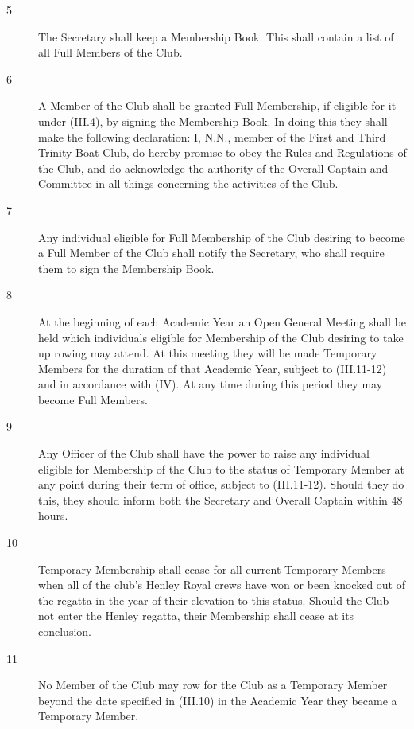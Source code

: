 \documentclass{article}
\begin{document}
\begin{description}
\begin{description}
	\item[5] The Secretary shall keep a Membership Book. This shall contain a list of all
	Full Members of the Club.\\
	
	\item[6] A Member of the Club shall be granted Full Membership, if eligible for it
	under (III.4), by signing the Membership Book. In doing this they shall make
	the following declaration: I, N.N., member of the First and Third Trinity Boat
	Club, do hereby promise to obey the Rules and Regulations of the Club, and
	do acknowledge the authority of the Overall Captain and Committee in all
	things concerning the activities of the Club.\\
	
	\item[7] Any individual eligible for Full Membership of the Club desiring to become a
	Full Member of the Club shall notify the Secretary, who shall require them to
	sign the Membership Book.\\
	
	\item[8] At the beginning of each Academic Year an Open General Meeting shall be
	held which individuals eligible for Membership of the Club desiring to take up
	rowing may attend. At this meeting they will be made Temporary Members
	for the duration of that Academic Year, subject to (III.11-12) and in
	accordance with (IV). At any time during this period they may become Full
	Members.\\
	
	\item[9] Any Officer of the Club shall have the power to raise any individual eligible
	for Membership of the Club to the status of Temporary Member at any point
	during their term of office, subject to (III.11-12). Should they do this, they
	should inform both the Secretary and Overall Captain within 48 hours.\\
	
	\item[10] Temporary Membership shall cease for all current Temporary Members when all of the club's Henley Royal crews have won or been knocked out of the regatta in the year of
	their elevation to this status. Should the Club not enter the Henley regatta,
	their Membership shall cease at its conclusion.\\
	
	\item[11] No Member of the Club may row for the Club as a Temporary Member
	beyond the date specified in (III.10) in the Academic Year they became a
	Temporary Member.\\
	

\end{description}
\end{description}
\end{document}

